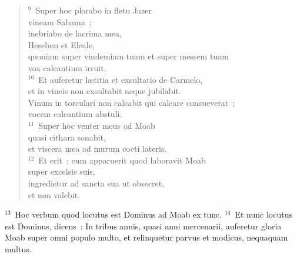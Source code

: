 \begin{verse}
${}^{9}$~Super hoc plorabo in fletu Jazer\\ vineam Sabama~;\\ inebriabo de lacrima mea,\\ Hesebon et Eleale,\\ quoniam super vindemiam tuam et super messem tuam\\ vox calcantium irruit.\\
${}^{10}$~Et auferetur l\ae titia et exsultatio de Carmelo,\\ et in vineis non exsultabit neque jubilabit.\\ Vinum in torculari non calcabit qui calcare consueverat~;\\ vocem calcantium abstuli.\\
${}^{11}$~Super hoc venter meus ad Moab\\ quasi cithara sonabit,\\ et viscera mea ad murum cocti lateris.\\
${}^{12}$~Et erit~: cum apparuerit quod laboravit Moab\\ super excelsis suis,\\ ingredietur ad sancta sua ut obsecret,\\ et non valebit.\end{verse}


${}^{13}$~Hoc verbum quod locutus est Dominus ad Moab ex tunc.
${}^{14}$~Et nunc locutus est Dominus, dicens~: In tribus annis, quasi anni mercenarii, auferetur gloria Moab super omni populo multo, et relinquetur parvus et modicus, nequaquam multus.

